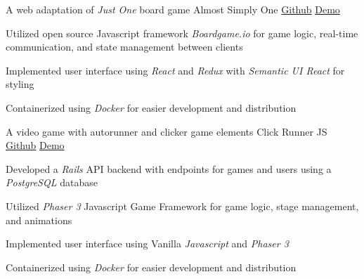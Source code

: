 \vspace{-1.0mm}

\begin{cventries}

  \cventry
    {A web adaptation of \textit{Just One} board game} %
    {Almost Simply One\vspace{-2.0mm}} %
    {\href{https://github.com/jhcheung/almost-simply-one}{Github}\vspace{-2.0mm}} %
    {\href{https://almost-simply-one.herokuapp.com/}{Demo}} %
    {
      \begin{cvitems} %
		\item {Utilized open source Javascript framework \textit{Boardgame.io} for game logic, real-time communication, and state management between clients}
        \item {Implemented user interface using \textit{React} and \textit{Redux} with \textit{Semantic UI React} for styling}
        \item {Containerized using \textit{Docker} for easier development and distribution}   
    \end{cvitems}
    }

  \cventry
    {A video game with autorunner and clicker game elements} %
    {Click Runner JS\vspace{-2.0mm}} %
    {\href{https://github.com/jhcheung/click-runner-js}{Github}\vspace{-2.0mm}} %
    {\href{https://click-runner-js.herokuapp.com/}{Demo}} %
    {
    \begin{cvitems} %
      \item {Developed a \textit{Rails} API backend with endpoints for games and users using a \textit{PostgreSQL} database} 
		  \item {Utilized \textit{Phaser 3} Javascript Game Framework for game logic, stage management, and animations}
		  \item {Implemented user interface using Vanilla \textit{Javascript} and \textit{Phaser 3}} 
      \item {Containerized using \textit{Docker} for easier development and distribution}
    \end{cvitems}
  }


\end{cventries}

